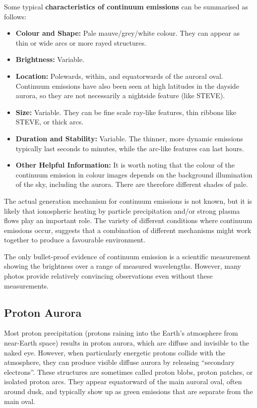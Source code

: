 \documentclass{article}
\newcommand{\contributed}[1]{%
    \par\noindent
    \begingroup
    \setlength{\leftskip}{1em}%
    \itshape
    Contributors: #1
    \par
    \endgroup
    \vspace{0.5em}
}
\begin{document}
Some typical {\bf characteristics of continuum emissions} can be summarised as follows:
\begin{itemize}
    \item \textbf{Colour and Shape:} Pale mauve/grey/white colour. They can appear as thin or wide arcs or more rayed structures.
    \item \textbf{Brightness:} Variable.
    \item \textbf{Location:} Polewards, within, and equatorwards of the auroral oval. Continuum emissions have also been seen at high latitudes in the dayside aurora, so they are not necessarily a nightside feature (like STEVE).
    \item \textbf{Size:} Variable. They can be fine scale ray-like features, thin ribbons like STEVE, or thick arcs.
    \item \textbf{Duration and Stability:} Variable. The thinner, more dynamic emissions typically last seconds to minutes, while the arc-like features can last hours.
    \item \textbf{Other Helpful Information:} It is worth noting that the colour of the continuum emission in colour images depends on the background illumination of the sky, including the aurora. There are therefore different shades of pale.
    \end{itemize}


The actual generation mechanism for continuum emissions is not known, but it is likely that ionospheric heating by particle precipitation and/or strong plasma flows play an important role. The variety of different conditions where continuum emissions occur, suggests that a combination of different mechanisms might work together to produce a favourable environment.

The only bullet-proof evidence of continuum emission is a scientific measurement showing the brightness over a range of measured wavelengths. However, many photos provide relatively convincing observations even without these measurements. 


\subsection{Proton Aurora}\label{Proton Aurora}

Most proton precipitation (protons raining into the Earth's atmosphere from near-Earth space) results in proton aurora, which are diffuse and invisible to the naked eye. However, when particularly energetic protons collide with the atmosphere, they can produce visible diffuse aurora by releasing ``secondary electrons''. These structures are sometimes called proton blobs, proton patches, or isolated proton arcs. They  appear equatorward of the main auroral oval, often around dusk, and typically show up as green emissions that are separate from the main oval.
\end{document}
